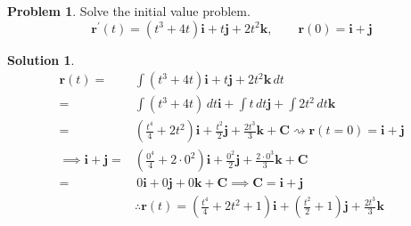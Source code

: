 \documentclass[10pt]{article}
\theoremstyle{definition}
\newtheorem{problem}{Problem}
\newtheorem{soln}{Solution}
\begin{document}
\begin{problem} Solve the initial value problem.
$$\mathbf{r}^\prime(t)=(t^3+4t)\mathbf{i}+t\mathbf{j}+2t^2\mathbf{k},\qquad\mathbf{r}(0)=\mathbf{i}+\mathbf{j}$$
\end{problem}
\begin{soln}
  \begin{align*}
    \mathbf{r}(t) =                  & \int (t^3+4t)\mathbf{i}+t\mathbf{j}+2t^2\mathbf{k} \,dt                                                                                                     \\
    =                                & \int (t^3+4t)\,dt\mathbf{i}+\int t\,dt\mathbf{j}+\int 2t^2\,dt\mathbf{k}                                                                                    \\
    =                                & \left(\frac{t^4}{4}+2t^2\right)\mathbf{i}+\frac{t^2}{2}\mathbf{j}+\frac{2t^3}{3}\mathbf{k}+\mathbf{C}\rightsquigarrow \mathbf{r}(t=0)=\mathbf{i}+\mathbf{j} \\
    \implies \mathbf{i}+\mathbf{j} = & \left(\frac{0^4}{4}+2\cdot0^2\right)\mathbf{i}+\frac{0^2}{2}\mathbf{j}+\frac{2\cdot0^3}{3}\mathbf{k}+\mathbf{C}                                             \\
    =                                & \,0\mathbf{i}+0\mathbf{j}+0\mathbf{k}+\mathbf{C}\implies\mathbf{C}=\mathbf{i}+\mathbf{j}                                                                    \\
                                     & \therefore \mathbf{r}(t)=\left(\frac{t^4}{4}+2t^2 + 1\right)\mathbf{i}+\left(\frac{t^2}{2}+1\right)\mathbf{j}+\frac{2t^3}{3}\mathbf{k}
  \end{align*}
\end{soln}
\end{document}
